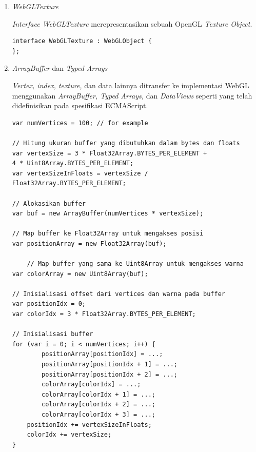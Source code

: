 \documentclass[a4paper,twoside]{article}
\begin{document}
\begin{enumerate}
\begin{enumerate}
	{\it Interface WebGLProgram} merepresentasikan sebuah OpenGL {\it Program Object}.
	\begin{lstlisting}[caption={{\it Program Object} pada OpenGL.}, captionpos=b]
interface WebGLProgram : WebGLObject {
};
	\end{lstlisting}
	
 {\it WebGLShader}

	{\it Interface WebGLShader} merepresentasikan sebuah OpenGL {\it Shader Object}.
	\begin{lstlisting}[caption={{\it Shader Object} pada OpenGL.}, captionpos=b]
interface WebGLShader : WebGLObject {
};
	\end{lstlisting}

\item {\it WebGLTexture}

	{\it Interface WebGLTexture} merepresentasikan sebuah OpenGL {\it Texture Object}.
	\begin{lstlisting}[caption={{\it Texture Object} pada OpenGL.}, captionpos=b]
interface WebGLTexture : WebGLObject {
};
	\end{lstlisting}
\item {\it ArrayBuffer} dan {\it Typed Arrays}

	{\it Vertex, index, texture,} dan data lainnya ditransfer ke implementasi WebGL menggunakan {\it ArrayBuffer, Typed Arrays,} dan {\it DataViews} seperti yang telah didefinisikan pada spesifikasi ECMAScript.
\begin{lstlisting}[caption={Transfer data ke implementasi WebGL.}, captionpos=b]
var numVertices = 100; // for example

// Hitung ukuran buffer yang dibutuhkan dalam bytes dan floats
var vertexSize = 3 * Float32Array.BYTES_PER_ELEMENT +
4 * Uint8Array.BYTES_PER_ELEMENT;
var vertexSizeInFloats = vertexSize / Float32Array.BYTES_PER_ELEMENT;

// Alokasikan buffer
var buf = new ArrayBuffer(numVertices * vertexSize);

// Map buffer ke Float32Array untuk mengakses posisi
var positionArray = new Float32Array(buf);

	// Map buffer yang sama ke Uint8Array untuk mengakses warna
var colorArray = new Uint8Array(buf);

// Inisialisasi offset dari vertices dan warna pada buffer
var positionIdx = 0;
var colorIdx = 3 * Float32Array.BYTES_PER_ELEMENT;

// Inisialisasi buffer
for (var i = 0; i < numVertices; i++) {
    	positionArray[positionIdx] = ...;
    	positionArray[positionIdx + 1] = ...;
    	positionArray[positionIdx + 2] = ...;
    	colorArray[colorIdx] = ...;
    	colorArray[colorIdx + 1] = ...;
    	colorArray[colorIdx + 2] = ...;
    	colorArray[colorIdx + 3] = ...;
   	positionIdx += vertexSizeInFloats;
   	colorIdx += vertexSize;
}
\end{lstlisting}
	

\end{enumerate}
\end{enumerate}
\end{document}
